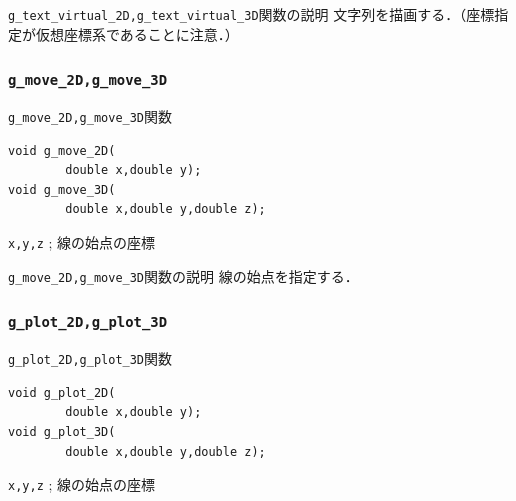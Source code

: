 \documentclass[a4paper,12pt]{jsarticle}%
\begin{document}
\begin{itembox}[l]{\texttt{g\_text\_virtual\_2D,g\_text\_virtual\_3D}関数の説明}
文字列を描画する．（座標指定が仮想座標系であることに注意．）
\end{itembox}

\begin{figure}[htb]
\end{figure}




\clearpage
\subsubsection{\texttt{g\_move\_2D,g\_move\_3D}}

\begin{itembox}[l]{\texttt{g\_move\_2D,g\_move\_3D}関数}
\begin{verbatim}
void g_move_2D(
        double x,double y);
void g_move_3D(
        double x,double y,double z);     
\end{verbatim}
\verb|x,y,z| ; 線の始点の座標\\
\end{itembox}

\begin{itembox}[l]{\texttt{g\_move\_2D,g\_move\_3D}関数の説明}
線の始点を指定する．
\end{itembox}

\subsubsection{\texttt{g\_plot\_2D,g\_plot\_3D}}

\begin{itembox}[l]{\texttt{g\_plot\_2D,g\_plot\_3D}関数}
\begin{verbatim}
void g_plot_2D(
        double x,double y);
void g_plot_3D(
        double x,double y,double z);     
\end{verbatim}
\verb|x,y,z| ; 線の始点の座標\\
\end{itembox}
\end{document}
